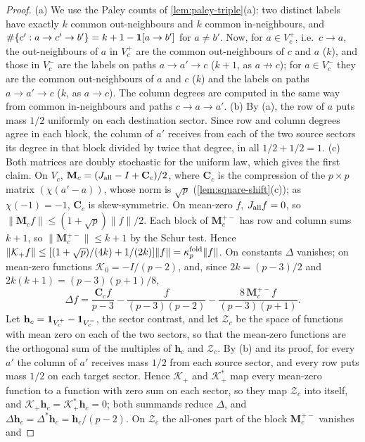 \begin{proof}
(a) We use the Paley counts of \cref{lem:paley-triple}(a): two distinct
labels have exactly $k$ common out-neighbours and $k$ common in-neighbours,
and $\#\{c':a\to c'\to b'\}=k+1-\mathbf 1[a\to b']$ for $a\ne b'$. Now, for
$a\in V_c^+$, i.e.\ $c\to a$, the out-neighbours of $a$ in $V_c^+$ are the
common out-neighbours of $c$ and $a$ ($k$), and those in $V_c^-$ are the
labels on paths $a\to a'\to c$ ($k+1$, as $a\not\to c$); for $a\in V_c^-$ they
are the common out-neighbours of $a$ and $c$ ($k$) and the labels on paths
$a\to a'\to c$ ($k$, as $a\to c$). The column degrees are computed in the
same way from common in-neighbours and paths $c\to a\to a'$.
(b) By (a), the row of $a$ puts mass $1/2$ uniformly on each destination
sector. Since row and column degrees agree in each block, the column of $a'$
receives from each of the two source sectors its degree in that block
divided by twice that degree, in all $1/2+1/2=1$.
(c) Both matrices are doubly stochastic for the uniform law, which gives
the first claim. On $V_c$, $\mathbf M_c=(J_{\mathrm{all}}-I+\mathbf C_c)/2$, where
$\mathbf C_c$ is the compression of the $p\times p$ matrix $(\chi(a'-a))$,
whose norm is $\sqrt p$ (\cref{lem:square-shift}(c)); as $\chi(-1)=-1$,
$\mathbf C_c$ is skew-symmetric. On mean-zero $f$, $J_{\mathrm{all}} f=0$, so
$\|\mathbf M_cf\|\le(1+\sqrt p)\|f\|/2$. Each block of $\mathbf M_c^{+-}$ has
row and column sums $k+1$, so $\|\mathbf M_c^{+-}\|\le k+1$ by the Schur test.
Hence $\|\mathcal K_+f\|\le[(1+\sqrt p)/(4k)+1/(2k)]\|f\|=\kappa^{\rm fold}_p\|f\|$.
On constants $\Delta$ vanishes; on mean-zero functions
$\mathcal K_0=-I/(p-2)$, and, since $2k=(p-3)/2$ and $2k(k+1)=(p-3)(p+1)/8$,
\[
 \Delta f=\frac{\mathbf C_cf}{p-3}-\frac f{(p-3)(p-2)}
  -\frac{8\,\mathbf M_c^{+-}f}{(p-3)(p+1)} .
\]
Let $\mathbf h_c=\mathbf 1_{V_c^+}-\mathbf 1_{V_c^-}$, the sector contrast, and let
$\mathcal Z_c$ be the space of functions with mean zero on each of the two
sectors, so that the mean-zero functions are the orthogonal sum of the
multiples of $\mathbf h_c$ and $\mathcal Z_c$. By (b) and its proof, for every
$a'$ the column of $a'$ receives mass $1/2$ from each source sector, and every
row puts mass $1/2$ on each target sector. Hence $\mathcal K_+$ and
$\mathcal K_+^*$ map every mean-zero function to a function with zero sum on
each sector, so they map $\mathcal Z_c$ into itself, and
$\mathcal K_+\mathbf h_c=\mathcal K_+^*\mathbf h_c=0$; both summands reduce
$\Delta$, and $\Delta\mathbf h_c=\Delta^*\mathbf h_c=\mathbf h_c/(p-2)$. On
$\mathcal Z_c$ the all-ones part of the block $\mathbf M_c^{+-}$ vanishes and

\end{proof}
